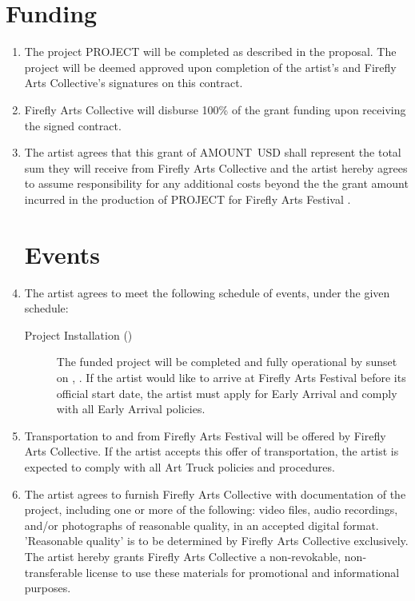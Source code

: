 \documentclass[11pt]{article}
\newcommand{\fac}{Firefly Arts Collective}
\newcommand{\project}{PROJECT}
\newcommand{\amount}{AMOUNT}
\begin{document}
\section*{Funding}
\begin{enumerate}
\item The project \project{} will be completed as described in the proposal.  The project will be deemed approved upon
  completion of the artist's and \fac{}'s signatures on this contract.

\item \fac{} will disburse 100\% of the grant funding upon receiving the signed contract.

\item The artist agrees that this grant of \amount{}\ USD shall represent the total sum they will receive from \fac{} and the artist hereby
  agrees to assume responsibility for any additional costs beyond the the grant amount incurred in the production of
  \project{} for Firefly Arts Festival \the\year{}.

\section*{Events}
\item The artist agrees to meet the following schedule of events, under the given schedule:

  \begin{description}
    \item[Project Installation (\instdate{})] The funded project will be completed and fully operational by sunset on
      \instday{}, \instdate{}.  If the artist would like to arrive at Firefly Arts Festival before its official start
      date, the artist must apply for Early Arrival and comply with all Early Arrival policies.
  \end{description}

\item Transportation to and from Firefly Arts Festival will be offered by \fac{}.  If the artist accepts this offer of
  transportation, the artist is expected to comply with all Art Truck policies and procedures.

\item The artist agrees to furnish \fac{} with documentation of the project, including one or more of the following: video
  files, audio recordings, and/or photographs of reasonable quality, in an accepted digital format.  'Reasonable quality' is to be determined by
 \fac{} exclusively.  The artist hereby grants \fac{} a non-revokable, non-transferable license to use these materials for promotional and informational
 purposes.


\end{enumerate}
\end{document}

